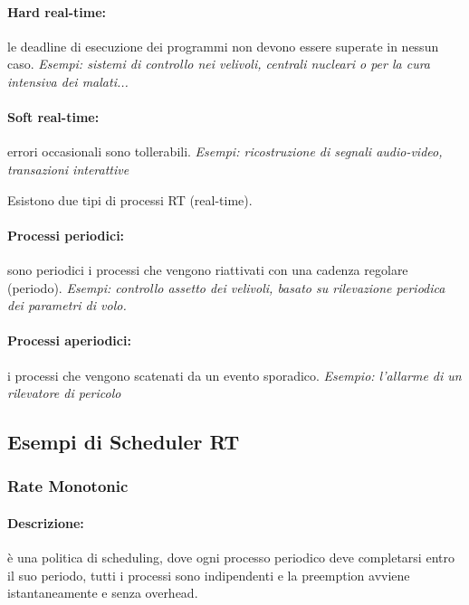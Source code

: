 \paragraph{Hard real-time:} le deadline di esecuzione dei programmi non devono essere superate in nessun caso.
\newline
\textit{Esempi: sistemi di controllo nei velivoli, centrali nucleari o per la cura intensiva dei malati...}

\paragraph{Soft real-time:} errori occasionali sono tollerabili.
\newline
\textit{Esempi: ricostruzione di segnali audio-video, transazioni interattive}
\newline

Esistono due tipi di processi RT (real-time).

\paragraph{Processi periodici:} sono periodici i processi che vengono riattivati con una cadenza regolare (periodo).
\newline
\textit{Esempi: controllo assetto dei velivoli, basato su rilevazione periodica dei parametri di volo.}

\paragraph{Processi aperiodici:} i processi che vengono scatenati da un evento sporadico.
\newline
\textit{Esempio: l'allarme di un rilevatore di pericolo}

\newpage
\subsection{Esempi di Scheduler RT}
\subsubsection{Rate Monotonic}
\paragraph{Descrizione:} è una politica di scheduling, dove ogni processo periodico deve completarsi entro il suo periodo, tutti i processi sono indipendenti e la preemption avviene istantaneamente e senza overhead.

